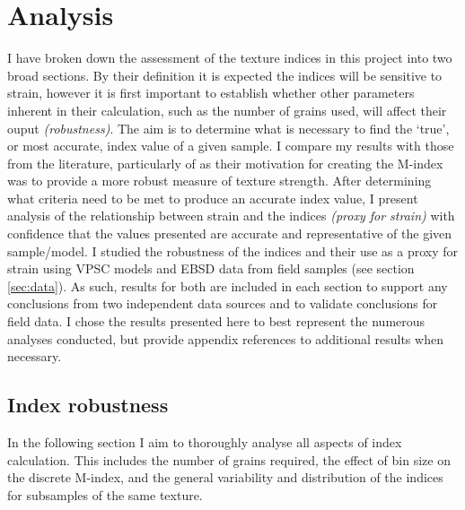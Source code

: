 \documentclass[a4paper,12pt,twoside]{report}
\numberwithin{equation}{chapter}
\begin{document}
\chapter{Analysis} \label{chap:analysis}
\vspace{-1cm}
I have broken down the assessment of the texture indices in this project into two broad sections. By their definition it is expected the indices will be sensitive to strain, however it is first important to establish whether other parameters inherent in their calculation, such as the number of grains used, will affect their ouput \emph{(robustness)}. The aim is to determine what is necessary to find the \lq{}true\rq{}, or most accurate, index value of a given sample. I compare my results with those from the literature, particularly of \cite{Skemer} as their motivation for creating the M-index was to provide a more robust measure of texture strength. After determining what criteria need to be met to produce an accurate index value, I present analysis of the relationship between strain and the indices \emph{(proxy for strain)} with confidence that the values presented are accurate and representative of the given sample/model. I studied the robustness of the indices and their use as a proxy for strain using VPSC models and EBSD data from field samples (see section \ref{sec:data}). As such, results for both are included in each section to support any conclusions from two independent data sources and to validate conclusions for field data. I chose the results presented here to best represent the numerous analyses conducted, but provide appendix references to additional results when necessary.       


\section{Index robustness}
In the following section I aim to thoroughly analyse all aspects of index calculation. This includes the number of grains required, the effect of bin size on the discrete M-index, and the general variability and distribution of the indices for subsamples of the same texture. 
\end{document}
